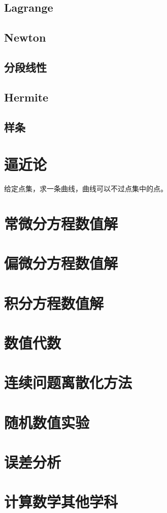 \documentclass[UTF8]{../09-Mathematics}
\begin{document}
\section{Lagrange}
\section{Newton}
\section{分段线性}
\section{Hermite}
\section{样条}

\chapter{逼近论}
给定点集，求一条曲线，曲线可以不过点集中的点。

\chapter{常微分方程数值解}
\chapter{偏微分方程数值解}
\chapter{积分方程数值解}
\chapter{数值代数}
\chapter{连续问题离散化方法}
\chapter{随机数值实验}
\chapter{误差分析}
\chapter{计算数学其他学科}
\end{document}
